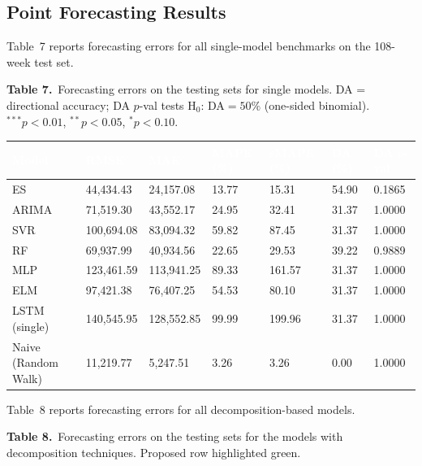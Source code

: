 \documentclass[12pt,a4paper]{article}
\newcommand{\hdrrow}[1]{\textcolor{white}{\textbf{#1}}}
\begin{document}
\subsection{Point Forecasting Results}

Table~7 reports forecasting errors for all single-model benchmarks on the 108-week
test set.

\vspace{4pt}
\noindent\textbf{Table 7.}~Forecasting errors on the testing sets for single models.
DA = directional accuracy; DA $p$-val tests H$_0$: DA$=50\%$ (one-sided binomial).
$^{***}p<0.01$, $^{**}p<0.05$, $^*p<0.10$.
\vspace{3pt}

\renewcommand{\arraystretch}{1.25}

\noindent\begin{tabular}{L{3.4cm} R{2.2cm} R{2.2cm} R{1.6cm} R{1.7cm} R{1.3cm} R{1.6cm}}
\hdrrow{Model} & \hdrrow{RMSE} & \hdrrow{MAE} & \hdrrow{MAPE (\%)} & \hdrrow{sMAPE (\%)} & \hdrrow{DA (\%)} & \hdrrow{DA $p$-val} \\
\hline
ES                  & 44,434.43  & 24,157.08  & 13.77 & 15.31 & 54.90 & 0.1865 \\
ARIMA               & 71,519.30  & 43,552.17  & 24.95 & 32.41 & 31.37 & 1.0000 \\
SVR                 & 100,694.08 & 83,094.32  & 59.82 & 87.45 & 31.37 & 1.0000 \\
RF                  & 69,937.99  & 40,934.56  & 22.65 & 29.53 & 39.22 & 0.9889 \\
MLP                 & 123,461.59 & 113,941.25 & 89.33 & 161.57& 31.37 & 1.0000 \\
ELM                 & 97,421.38  & 76,407.25  & 54.53 & 80.10 & 31.37 & 1.0000 \\
LSTM (single)       & 140,545.95 & 128,552.85 & 99.99 & 199.96& 31.37 & 1.0000 \\
Naive (Random Walk) & 11,219.77  &  5,247.51  &  3.26 &  3.26 &  0.00 & 1.0000 \\
\end{tabular}
\renewcommand{\arraystretch}{1}
\vspace{8pt}

Table~8 reports forecasting errors for all decomposition-based models.

\vspace{4pt}
\noindent\textbf{Table 8.}~Forecasting errors on the testing sets for the models
with decomposition techniques. Proposed row highlighted green.
\vspace{3pt}
\end{document}
